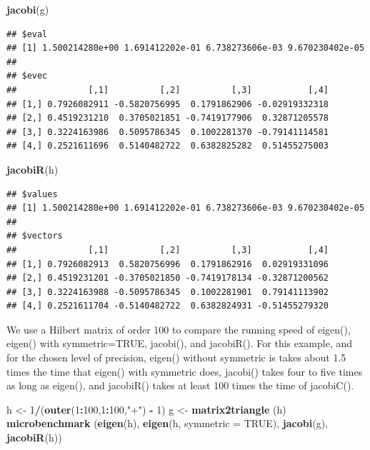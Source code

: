 \documentclass[12pt,]{article}
\newenvironment{Shaded}{\begin{snugshade}}{\end{snugshade}}
\newcommand{\KeywordTok}[1]{\textcolor[rgb]{0.13,0.29,0.53}{\textbf{#1}}}
\newcommand{\DataTypeTok}[1]{\textcolor[rgb]{0.13,0.29,0.53}{#1}}
\newcommand{\DecValTok}[1]{\textcolor[rgb]{0.00,0.00,0.81}{#1}}
\newcommand{\StringTok}[1]{\textcolor[rgb]{0.31,0.60,0.02}{#1}}
\newcommand{\OtherTok}[1]{\textcolor[rgb]{0.56,0.35,0.01}{#1}}
\newcommand{\OperatorTok}[1]{\textcolor[rgb]{0.81,0.36,0.00}{\textbf{#1}}}
\newcommand{\NormalTok}[1]{#1}
\begin{document}
\begin{Shaded}
\begin{Highlighting}[]
\KeywordTok{jacobi}\NormalTok{(g)}
\end{Highlighting}
\end{Shaded}

\begin{verbatim}
## $eval
## [1] 1.500214280e+00 1.691412202e-01 6.738273606e-03 9.670230402e-05
## 
## $evec
##              [,1]          [,2]          [,3]           [,4]
## [1,] 0.7926082911 -0.5820756995  0.1791862906 -0.02919332318
## [2,] 0.4519231210  0.3705021851 -0.7419177906  0.32871205578
## [3,] 0.3224163986  0.5095786345  0.1002281370 -0.79141114581
## [4,] 0.2521611696  0.5140482722  0.6382825282  0.51455275003
\end{verbatim}

\begin{Shaded}
\begin{Highlighting}[]
\KeywordTok{jacobiR}\NormalTok{(h)}
\end{Highlighting}
\end{Shaded}

\begin{verbatim}
## $values
## [1] 1.500214280e+00 1.691412202e-01 6.738273606e-03 9.670230402e-05
## 
## $vectors
##              [,1]          [,2]          [,3]           [,4]
## [1,] 0.7926082913  0.5820756996  0.1791862916  0.02919331096
## [2,] 0.4519231201 -0.3705021850 -0.7419178134 -0.32871200562
## [3,] 0.3224163988 -0.5095786345  0.1002281901  0.79141113902
## [4,] 0.2521611704 -0.5140482722  0.6382824931 -0.51455279320
\end{verbatim}

We use a Hilbert matrix of order 100 to compare the running speed of
eigen(), eigen() with symmetric=TRUE, jacobi(), and jacobiR(). For this
example, and for the chosen level of precision, eigen() without
symmetric is takes about 1.5 times the time that eigen() with symmetric
does, jacobi() takes four to five times as long as eigen(), and
jacobiR() takes at least 100 times the time of jacobiC().

\begin{Shaded}
\begin{Highlighting}[]
\NormalTok{h <-}\StringTok{ }\DecValTok{1}\OperatorTok{/}\NormalTok{(}\KeywordTok{outer}\NormalTok{(}\DecValTok{1}\OperatorTok{:}\DecValTok{100}\NormalTok{,}\DecValTok{1}\OperatorTok{:}\DecValTok{100}\NormalTok{,}\StringTok{"+"}\NormalTok{) }\OperatorTok{-}\StringTok{ }\DecValTok{1}\NormalTok{)}
\NormalTok{g <-}\StringTok{ }\KeywordTok{matrix2triangle}\NormalTok{ (h)}
\KeywordTok{microbenchmark}\NormalTok{ (}\KeywordTok{eigen}\NormalTok{(h), }\KeywordTok{eigen}\NormalTok{(h, }\DataTypeTok{symmetric =} \OtherTok{TRUE}\NormalTok{), }\KeywordTok{jacobi}\NormalTok{(g), }\KeywordTok{jacobiR}\NormalTok{(h))}
\end{Highlighting}
\end{Shaded}
\end{document}
